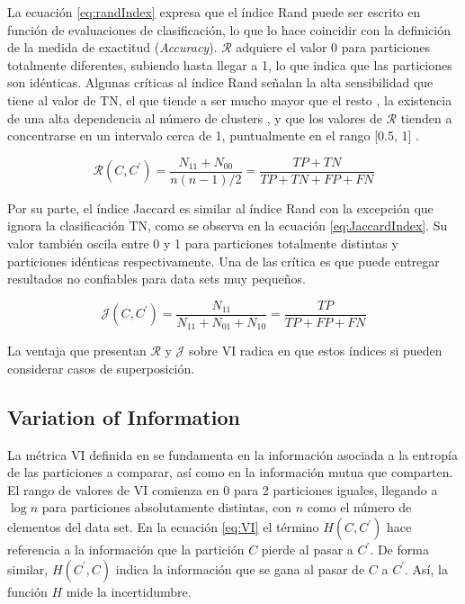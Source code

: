 La ecuaci\'on \ref{eq:randIndex} expresa que el \'indice Rand puede ser escrito en funci\'on de evaluaciones de clasificaci\'on, lo que lo hace coincidir con la definici\'on de la medida de exactitud ({\it Accuracy}). $\mathcal{R}$ adquiere el valor 0 para particiones totalmente diferentes, subiendo hasta llegar a 1, lo que indica que las particiones son id\'enticas. Algunas cr\'iticas al \'indice Rand se\~nalan la alta sensibilidad que tiene al valor de TN, el que tiende a ser mucho mayor que el resto , la existencia de una alta dependencia al n\'umero de clusters , y que los valores de $\mathcal{R}$ tienden a concentrarse en un intervalo cerca de 1, puntualmente en el rango [0.5, 1] .

\begin{equation}
\mathcal{R}(C,C^{\prime}) = \frac{N_{11} + N_{00}}{n(n-1)/2} = \frac{TP + TN}{TP + TN + FP + FN}
\label{eq:randIndex}
\end{equation}

Por su parte, el \'indice Jaccard es similar al \'indice Rand con la excepci\'on que ignora la clasificaci\'on TN, como se observa en la ecuaci\'on \ref{eq:JaccardIndex}. Su valor tambi\'en oscila entre 0 y 1 para particiones totalmente distintas y particiones id\'enticas respectivamente. Una de las cr\'itica es que puede entregar resultados no confiables para data sets muy peque\~nos.

\begin{equation}
\mathcal{J}(C,C^{\prime}) = \frac{N_{11}}{N_{11} + N_{01} + N_{10}} = \frac{TP}{TP + FP + FN}
\label{eq:JaccardIndex}
\end{equation}

La ventaja que presentan $\mathcal{R}$ y $\mathcal{J}$ sobre VI radica en que estos \'indices si pueden considerar casos de superposici\'on.

\subsection{Variation of Information}
La m\'etrica VI definida en \citet{meilua2007comparing} se fundamenta en la informaci\'on asociada a la entrop\'ia de las particiones a comparar, as\'i como en la informaci\'on mutua que comparten. El rango de valores de VI comienza en 0 para 2 particiones iguales, llegando a $\log n$ para particiones absolutamente distintas, con $n$ como el n\'umero de elementos del data set. En la ecuaci\'on \ref{eq:VI} el t\'ermino $H(C,C^{\prime})$ hace referencia a la informaci\'on que la partici\'on $C$ pierde al pasar a $C^{\prime}$. De forma similar, $H(C^{\prime},C)$ indica la informaci\'on que se gana al pasar de $C$ a $C^{\prime}$. As\'i, la función $H$ mide la incertidumbre.

